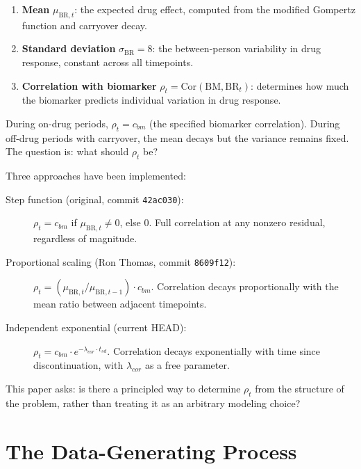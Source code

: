 \documentclass[11pt]{article}
\begin{document}
\begin{enumerate}
\item \textbf{Mean} $\mu_{\text{BR},t}$: the expected drug
  effect, computed from the modified Gompertz function and
  carryover decay.
\item \textbf{Standard deviation} $\sigma_{\text{BR}} = 8$:
  the between-person variability in drug response, constant
  across all timepoints.
\item \textbf{Correlation with biomarker}
  $\rho_t = \text{Cor}(\text{BM}, \text{BR}_t)$: determines
  how much the biomarker predicts individual variation in
  drug response.
\end{enumerate}

During on-drug periods, $\rho_t = c_{bm}$ (the specified
biomarker correlation). During off-drug periods with carryover,
the mean decays but the variance remains fixed. The question is:
what should $\rho_t$ be?

Three approaches have been implemented:

\begin{description}
\item[Step function (original, commit \texttt{42ac030}):]
  $\rho_t = c_{bm}$ if $\mu_{\text{BR},t} \neq 0$, else 0.
  Full correlation at any nonzero residual, regardless of
  magnitude.

\item[Proportional scaling (Ron Thomas, commit
  \texttt{8609f12}):] $\rho_t = (\mu_{\text{BR},t} /
  \mu_{\text{BR},t-1}) \cdot c_{bm}$. Correlation decays
  proportionally with the mean ratio between adjacent
  timepoints.

\item[Independent exponential (current HEAD):]
  $\rho_t = c_{bm} \cdot e^{-\lambda_{cor} \cdot t_{sd}}$.
  Correlation decays exponentially with time since
  discontinuation, with $\lambda_{cor}$ as a free parameter.
\end{description}

This paper asks: is there a principled way to determine
$\rho_t$ from the structure of the problem, rather than
treating it as an arbitrary modeling choice?

\section{The Data-Generating Process}
\end{document}
